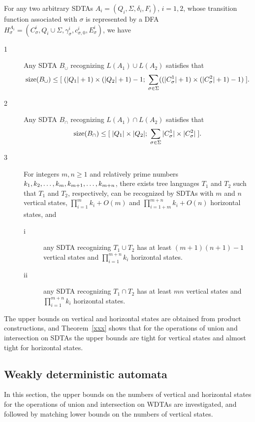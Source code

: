\documentclass[copyright]{eptcs}
\begin{document}
\begin{theorem}\label{xxx}
For any two arbitrary SDTAs $A_i=(Q_i,\Sigma,\delta_i,F_i)$,
$i=1,2$, whose transition function associated with $\sigma$ is
represented by a DFA $H_{\sigma}^{A_i}=(C_{\sigma}^i, Q_i \cup
\Sigma, \gamma_{\sigma}^i, c_{\sigma,0}^i, E_{\sigma}^i)$, we have
\begin{description}
  \item[1] Any SDTA $B_\cup$ recognizing $L(A_1)\cup L(A_2)$ satisfies that $${\rm size}(B_{\cup}) \leq [ \; (|Q_1|+1)\times
(|Q_2|+1)-1; \; \sum_{\sigma \in \Sigma} ((|C_{\sigma}^{1}|+1)
\times (|C_{\sigma}^{2}|+ 1) -1) \; ].$$
  \item[2] Any SDTA $B_\cap$ recognizing $L(A_1)\cap L(A_2)$ satisfies that $${\rm size}(B_{\cap}) \leq [ \; |Q_1|\times
|Q_2|; \; \sum_{\sigma \in \Sigma} |C_{\sigma}^{1}| \times
|C_{\sigma}^{2}| \; ].$$
  \item[3] For integers $m, n\geq 1$ and relatively prime numbers
  $k_1,k_2,\ldots,k_m,k_{m+1},\ldots,\\ k_{m+n}$, there exists
  tree languages $T_1$ and $T_2$ such that $T_1$ and $T_2$, respectively, can be
  recognized by SDTAs with $m$ and $n$ vertical states,
  $\prod_{i=1}^m k_i+O(m)$ and $\prod_{i=1+m}^{m+n} k_i+O(n)$ horizontal states, and
\begin{description}
  \item[i] any SDTA recognizing $T_1\cup T_2$ has at least
 $(m+1)(n+1)-1$ vertical
  states and $\prod_{i=1}^{m+n} k_i$ horizontal states.
  \item[ii] any SDTA recognizing $T_1\cap T_2$ has at least $mn$ vertical
  states and $\prod_{i=1}^{m+n} k_i$ horizontal states.
\end{description}
\end{description}
\end{theorem}


The upper bounds on vertical and horizontal states are obtained
from product constructions, and Theorem~\ref{xxx} shows that for
the operations of union and intersection on SDTAs the upper bounds
are tight for vertical states and almost tight for horizontal
states.


\subsection{Weakly deterministic automata}\label{wdta}

In this section, the upper bounds on the numbers of vertical and
horizontal states for the operations of union and intersection on
WDTAs are investigated, and followed by matching lower bounds on
the numbers of vertical states.
\end{document}
